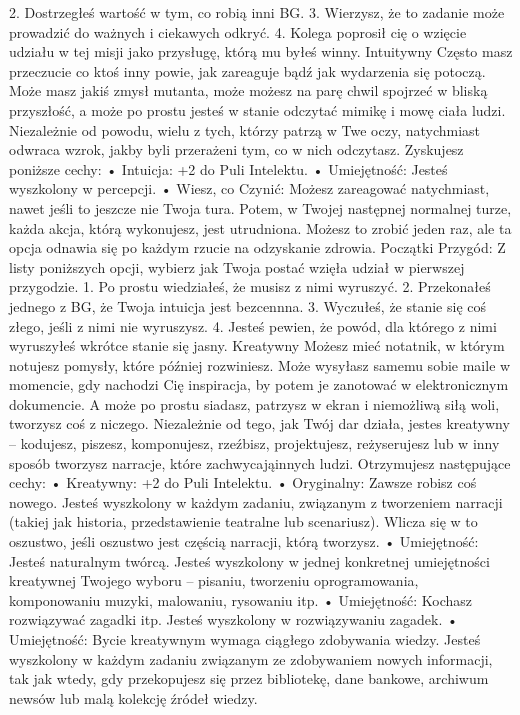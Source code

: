 2. Dostrzegłeś wartość w tym, co robią inni BG.
3. Wierzysz, że to zadanie może prowadzić do ważnych i ciekawych odkryć.
4. Kolega poprosił cię o wzięcie udziału w tej misji jako przysługę, którą mu byłeś winny.
Intuitywny
Często masz przeczucie co ktoś inny powie, jak zareaguje bądź jak wydarzenia się potoczą. Może masz jakiś zmysł mutanta, może możesz na parę chwil spojrzeć w bliską przyszłość, a może po prostu jesteś w stanie odczytać mimikę i mowę ciała ludzi. Niezależnie od powodu, wielu z tych, którzy patrzą w Twe oczy, natychmiast odwraca wzrok, jakby byli przerażeni tym, co w nich odczytasz.
Zyskujesz poniższe cechy:
    • Intuicja: +2 do Puli Intelektu.
    • Umiejętność: Jesteś wyszkolony w percepcji.
    • Wiesz, co Czynić: Możesz zareagować natychmiast, nawet jeśli to jeszcze nie Twoja tura. Potem, w Twojej następnej normalnej turze, każda akcja, którą wykonujesz, jest utrudniona. Możesz to zrobić jeden raz, ale ta opcja odnawia się po każdym rzucie na odzyskanie zdrowia.
Początki Przygód: Z listy poniższych opcji, wybierz jak Twoja postać wzięła udział w pierwszej przygodzie.
1. Po prostu wiedziałeś, że musisz z nimi wyruszyć.
2. Przekonałeś jednego z BG, że Twoja intuicja jest bezcennna.
3. Wyczułeś, że stanie się coś złego, jeśli z nimi nie wyruszysz.
4. Jesteś pewien, że powód, dla którego z nimi wyruszyłeś wkrótce stanie się jasny.
Kreatywny
Możesz mieć notatnik, w którym notujesz pomysły, które później rozwiniesz. Może wysyłasz samemu sobie maile w momencie, gdy nachodzi Cię inspiracja, by potem je zanotować w elektronicznym dokumencie. A może po prostu siadasz, patrzysz w ekran i niemożliwą siłą woli, tworzysz coś z niczego.
Niezależnie od tego, jak Twój dar działa, jestes kreatywny – kodujesz, piszesz, komponujesz, rzeźbisz, projektujesz, reżyserujesz lub w inny sposób tworzysz narracje, które zachwycająinnych ludzi.
Otrzymujesz następujące cechy:
    • Kreatywny: +2 do Puli Intelektu.
    • Oryginalny: Zawsze robisz coś nowego. Jesteś wyszkolony w każdym zadaniu, związanym z tworzeniem narracji (takiej jak historia, przedstawienie teatralne lub scenariusz). Wlicza się w to oszustwo, jeśli oszustwo jest częścią narracji, którą tworzysz.
    • Umiejętność: Jesteś naturalnym twórcą. Jesteś wyszkolony w jednej konkretnej umiejętności kreatywnej Twojego wyboru – pisaniu, tworzeniu oprogramowania, komponowaniu muzyki, malowaniu, rysowaniu itp.
    • Umiejętność: Kochasz rozwiązywać zagadki itp. Jesteś wyszkolony w rozwiązywaniu zagadek.
    • Umiejętność: Bycie kreatywnym wymaga ciągłego zdobywania wiedzy. Jesteś wyszkolony w każdym zadaniu związanym ze zdobywaniem nowych informacji, tak jak wtedy, gdy przekopujesz się przez bibliotekę, dane bankowe, archiwum newsów lub malą kolekcję źródeł wiedzy.
